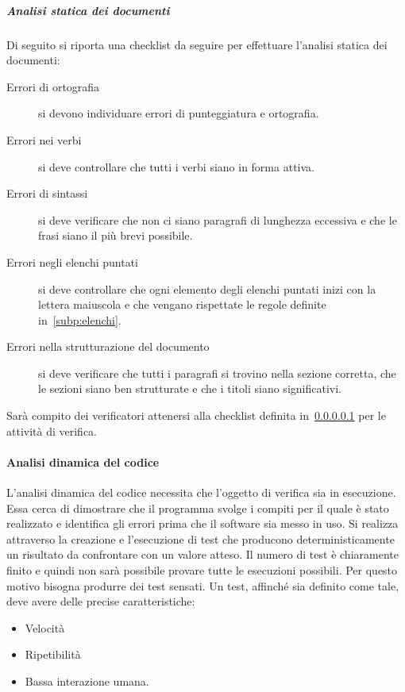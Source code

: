 \documentclass[../norme-di-progetto.tex]{subfiles}
\begin{document}
\subparagraph{Analisi statica dei documenti}%
\label{subp:analisi_statica_dei_documenti}
Di seguito si riporta una checklist da seguire per effettuare l'analisi statica dei documenti:

\begin{description}
  \item [Errori di ortografia] si devono individuare errori di punteggiatura e ortografia.
  \item [Errori nei verbi] si deve controllare che tutti i verbi siano in forma attiva.
  \item [Errori di sintassi] si deve verificare che non ci siano paragrafi di lunghezza eccessiva e che le frasi siano il più brevi possibile.
  \item [Errori negli elenchi puntati] si deve controllare che ogni elemento degli elenchi puntati inizi con la lettera maiuscola e che vengano rispettate le regole definite in~\ref{subp:elenchi}.
  \item [Errori nella strutturazione del documento] si deve verificare che tutti i paragrafi si trovino nella sezione corretta, che le sezioni siano ben strutturate e che i titoli siano significativi.
\end{description}

Sarà compito dei verificatori attenersi alla checklist definita in~\ref{subp:analisi_statica_dei_documenti} per le attività di verifica.

\paragraph{Analisi dinamica del codice}%
\label{par:analisi_dinamica_del_codice}
L'analisi dinamica del codice necessita che l'oggetto di verifica sia in esecuzione.
Essa cerca di dimostrare che il programma svolge i compiti per il quale è stato realizzato e identifica gli errori prima che il software sia messo in uso.
Si realizza attraverso la creazione e l'esecuzione di test che producono deterministicamente un risultato da confrontare con un valore atteso.
Il numero di test è chiaramente finito e quindi non sarà possibile provare tutte le esecuzioni possibili.
Per questo motivo bisogna produrre dei test sensati.
Un test, affinché sia definito come tale, deve avere delle precise caratteristiche:

\begin{itemize}
  \item Velocità
  \item Ripetibilità
  \item Bassa interazione umana.
\end{itemize}
\end{document}
